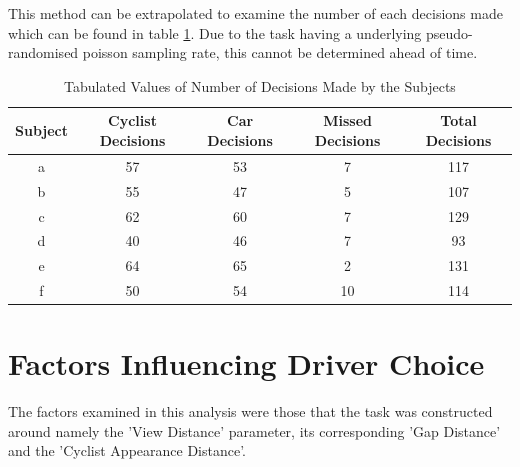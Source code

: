 This method can be extrapolated to examine the number of each decisions made which can be found in table \ref{tab:RSLT_nDecisions}. Due to the task having a underlying pseudo-randomised poisson sampling rate, this cannot be determined ahead of time.
\begin{table}[H]
    \begin{center}
        \caption{Tabulated Values of Number of Decisions Made by the Subjects}
        \label{tab:RSLT_nDecisions}
        \begin{tabular}{ccccc}
        \hline
        Subject &   Cyclist Decisions   & Car Decisions & Missed Decisions & Total Decisions \\ \hline
        a       &   57  & 53    & 7     & 117   \\
        b       &   55  & 47    & 5     & 107   \\
        c       &   62  & 60    & 7     & 129   \\
        d       &   40  & 46    & 7     & 93    \\
        e       &   64  & 65    & 2     & 131   \\
        f       &   50  & 54    & 10    & 114   \\ \hline
        \end{tabular}
    \end{center}
\end{table}

\section{Factors Influencing Driver Choice}
The factors examined in this analysis were those that the task was constructed around namely the 'View Distance' parameter, its corresponding 'Gap Distance' and the 'Cyclist Appearance Distance'.

